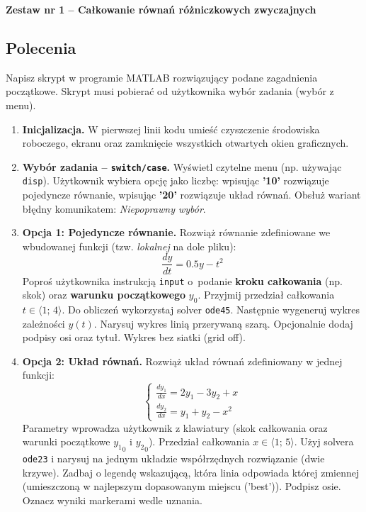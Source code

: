 \documentclass[a4paper,11pt]{article}
\begin{document}
\begin{center}
  {\large\bfseries Zestaw nr 1 \quad -- \quad Całkowanie równań różniczkowych zwyczajnych}
\end{center}
\hrulefill
\vspace{0.4cm}

\subsection*{Polecenia}

Napisz skrypt w programie MATLAB rozwiązujący podane zagadnienia początkowe. Skrypt musi pobierać od użytkownika wybór zadania (wybór z menu).

\begin{enumerate}[leftmargin=*, label=\textbf{\arabic*.}, itemsep=2pt]

  \item \textbf{Inicjalizacja.}
    W pierwszej linii kodu umieść czyszczenie środowiska roboczego, ekranu oraz zamknięcie wszystkich otwartych okien graficznych.

  \item \textbf{Wybór zadania -- \texttt{switch/case}.}
    Wyświetl czytelne menu (np. używając \texttt{disp}). Użytkownik wybiera opcję jako liczbę: wpisując \textbf{'10'} rozwiązuje pojedyncze równanie, wpisując \textbf{'20'} rozwiązuje układ równań. Obsłuż wariant błędny komunikatem: \textit{Niepoprawny wybór}.

  \item \textbf{Opcja 1: Pojedyncze równanie.}
    Rozwiąż równanie zdefiniowane we wbudowanej funkcji (tzw. \textit{lokalnej} na dole pliku):
    \[ \frac{dy}{dt} = 0.5y - t^2 \]
    Poproś użytkownika instrukcją \texttt{input} o~podanie \textbf{kroku całkowania} (np. skok) oraz \textbf{warunku początkowego} $y_0$. Przyjmij przedział całkowania $t \in \langle 1;\,4 \rangle$.
    Do obliczeń wykorzystaj solver \texttt{ode45}. Następnie wygeneruj wykres zależności $y(t)$. Narysuj wykres linią przerywaną szarą. Opcjonalnie dodaj podpisy osi oraz tytuł. Wykres bez siatki (grid off).

  \item \textbf{Opcja 2: Układ równań.}
    Rozwiąż układ równań zdefiniowany w jednej funkcji:\\[-0.5em]
    \[
    \begin{cases}
      \frac{dy_1}{dx} = 2y_1 - 3y_2 + x \\
      \frac{dy_2}{dx} = y_1 + y_2 - x^2
    \end{cases}
    \]
    Parametry wprowadza użytkownik z klawiatury (skok całkowania oraz warunki początkowe $ {y_1}_{0} $ i $ {y_2}_{0} $). Przedział całkowania $x \in \langle 1;\,5 \rangle$.
    Użyj solvera \texttt{ode23} i narysuj na jednym układzie współrzędnych rozwiązanie (dwie krzywe). Zadbaj o legendę wskazującą, która linia odpowiada której zmiennej (umieszczoną w najlepszym dopasowanym miejscu ('best')). Podpisz osie. Oznacz wyniki markerami wedle uznania.

\end{enumerate}
\end{document}
